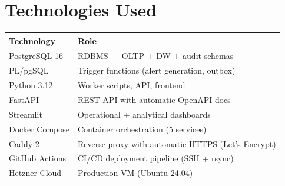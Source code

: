 \documentclass[11pt,a4paper]{article}
\begin{document}
\section{Technologies Used}

\begin{table}[H]
\centering
\begin{tabular}{@{}ll@{}}
\toprule
\textbf{Technology} & \textbf{Role} \\
\midrule
PostgreSQL 16 & RDBMS --- OLTP + DW + audit schemas \\
PL/pgSQL & Trigger functions (alert generation, outbox) \\
Python 3.12 & Worker scripts, API, frontend \\
FastAPI & REST API with automatic OpenAPI docs \\
Streamlit & Operational + analytical dashboards \\
Docker Compose & Container orchestration (5 services) \\
Caddy 2 & Reverse proxy with automatic HTTPS (Let's Encrypt) \\
GitHub Actions & CI/CD deployment pipeline (SSH + rsync) \\
Hetzner Cloud & Production VM (Ubuntu 24.04) \\
\bottomrule
\end{tabular}
\end{table}
\end{document}
